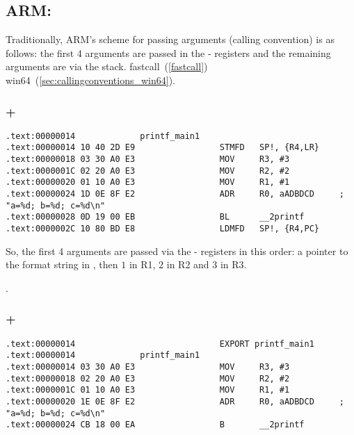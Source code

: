 \subsection{ARM: }

{Traditionally, ARM's scheme for passing arguments (calling convention) is as follows:
the first 4 arguments are passed in the - registers and the remaining arguments are via the stack}.
fastcall~(\ref{fastcall}) \OrENRU win64~(\ref{sec:callingconventions_win64}).

\subsubsection{\NonOptimizingKeil + \ARMMode}

\begin{lstlisting}[caption=\NonOptimizingKeil + \ARMMode]
.text:00000014             printf_main1
.text:00000014 10 40 2D E9                 STMFD   SP!, {R4,LR}
.text:00000018 03 30 A0 E3                 MOV     R3, #3
.text:0000001C 02 20 A0 E3                 MOV     R2, #2
.text:00000020 01 10 A0 E3                 MOV     R1, #1
.text:00000024 1D 0E 8F E2                 ADR     R0, aADBDCD     ; "a=%d; b=%d; c=%d\n"
.text:00000028 0D 19 00 EB                 BL      __2printf
.text:0000002C 10 80 BD E8                 LDMFD   SP!, {R4,PC}
\end{lstlisting}

{So, the first 4 arguments are passed via the - registers in this order:
a pointer to the \printf format string in , then $1$ in R1, $2$ in R2 and $3$ in R3}.

.

\subsubsection{\OptimizingKeil + \ARMMode}
\label{ARM_B_to_printf}

\begin{lstlisting}[caption=\OptimizingKeil + \ARMMode]
.text:00000014                             EXPORT printf_main1
.text:00000014             printf_main1
.text:00000014 03 30 A0 E3                 MOV     R3, #3
.text:00000018 02 20 A0 E3                 MOV     R2, #2
.text:0000001C 01 10 A0 E3                 MOV     R1, #1
.text:00000020 1E 0E 8F E2                 ADR     R0, aADBDCD     ; "a=%d; b=%d; c=%d\n"
.text:00000024 CB 18 00 EA                 B       __2printf
\end{lstlisting}


